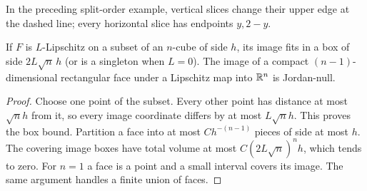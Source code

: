\begin{center}
\end{center}
In the preceding split-order example, vertical slices change their upper
edge at the dashed line; every horizontal slice has endpoints $y,2-y$.

\begin{lemma}
\label{lem:lipschitz-box-face}
If $F$ is $L$-Lipschitz on a subset of an $n$-cube of side $h$, its
image fits in a box of side $2L\sqrt n\,h$ (or is a singleton when
$L=0$). The image of a compact $(n-1)$-dimensional rectangular face
under a Lipschitz map into $\mathbb{R}^n$ is Jordan-null.
\end{lemma}
\begin{proof}
Choose one point of the subset. Every other point has distance at most
$\sqrt n h$ from it, so every image coordinate differs by at most
$L\sqrt n h$. This proves the box bound. Partition a face into at
most $C h^{-(n-1)}$ pieces of side at most $h$. The covering image
boxes have total volume at most $C(2L\sqrt n)^n h$, which tends to
zero. For $n=1$ a face is a point and a small interval covers its image.
The same argument handles a finite union of faces.
\end{proof}

